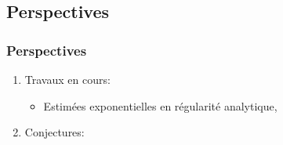 \documentclass[mathserif]{beamer}
\begin{document}
\subsection{Perspectives}
\begin{frame}
  \frametitle{Perspectives}
  \begin{enumerate}
  \item Travaux en cours:
    \begin{itemize}
    \item Estimées exponentielles en régularité analytique,
    \end{itemize}
  \item Conjectures:
    \begin{itemize}
    \end{itemize}
  \end{enumerate}
\end{frame}
\end{document}
